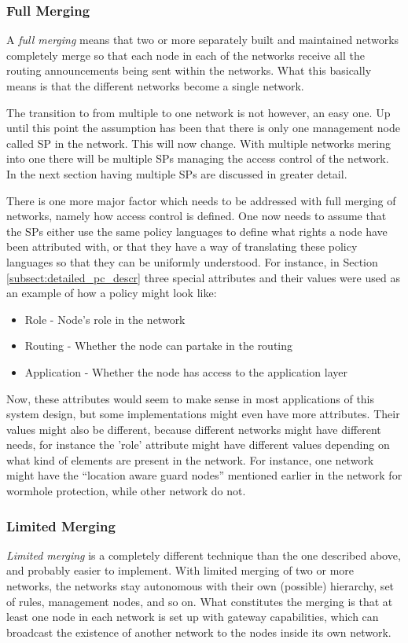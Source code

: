 \subsubsection*{Full Merging}
A \emph{full merging} means that two or more separately built and maintained
networks completely merge so that each node in each of the networks receive
all the routing announcements being sent within the networks. What this
basically means is that the different networks become a single network.

The transition to from multiple to one network is not however, an easy one. Up
until this point the assumption has been that there is only one management node
called \ac{SP} in the network. This will now change. With multiple networks
mering into one there will be multiple \acp{SP} managing the access control of
the network. In the next section having multiple \acp{SP} are discussed in
greater detail.

There is one more major factor which needs to be addressed with full merging of
networks, namely how access control is defined. One now needs to assume that the
\acp{SP} either use the same policy languages to define what rights a node have
been attributed with, or that they have a way of translating these policy
languages so that they can be uniformly understood. For instance, in Section
\ref{subsect:detailed_pc_descr} three special attributes and their values were
used as an example of how a policy might look like:

\begin{itemize}
  \item Role - Node's role in the network
  \item Routing - Whether the node can partake in the routing
  \item Application - Whether the node has access to the application layer
\end{itemize}

Now, these attributes would seem to make sense in most applications of this
system design, but some implementations might even have more attributes. Their
values might also be different, because different networks might have different
needs, for instance the 'role' attribute might have different values depending
on what kind of elements are present in the network. For instance, one network
might have the ``location aware guard nodes'' mentioned earlier in the network
for wormhole protection, while other network do not.

\subsubsection*{Limited Merging}
\emph{Limited merging} is a completely different technique than the one
described above, and probably easier to implement. With limited merging of two or more
networks, the networks stay autonomous with their own (possible) hierarchy, set
of rules, management nodes, and so on. What constitutes the merging is that at
least one node in each network is set up with gateway capabilities, which can
broadcast the existence of another network to the nodes inside its own network.

